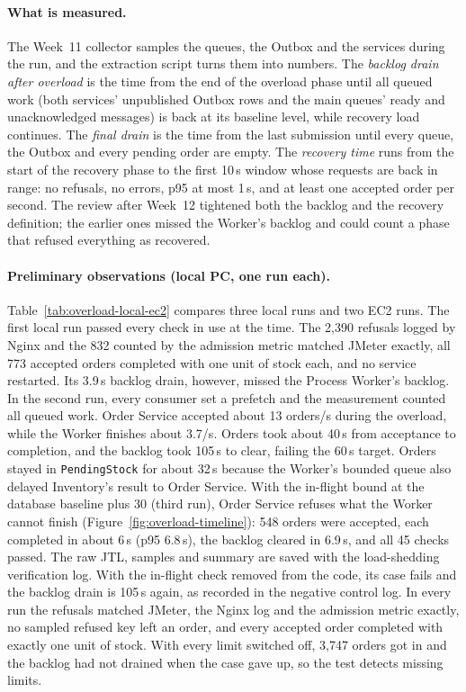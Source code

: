 \documentclass[a4paper]{report}
\begin{document}
\paragraph{What is measured.} The Week~11 collector samples the queues, the
Outbox and the services during the run, and the extraction script turns them
into numbers. The \emph{backlog drain after overload} is the time from the end
of the overload phase until all queued work (both services' unpublished Outbox
rows and the main queues' ready and unacknowledged messages) is back at its
baseline level, while recovery load continues. The \emph{final drain} is the
time from the last submission until every queue, the Outbox and every pending
order are empty. The \emph{recovery time} runs from the start of the recovery
phase to the first 10\,s window whose requests are back in range: no refusals,
no errors, p95 at most 1\,s, and at least one accepted order per second. The
review after Week~12 tightened both the backlog and the recovery definition;
the earlier ones missed the Worker's backlog and could count a phase that
refused everything as recovered.

\paragraph{Preliminary observations (local PC, one run each).}
Table~\ref{tab:overload-local-ec2} compares three local runs and two EC2 runs.
The first local run passed every check in use at the time. The 2,390
refusals logged by Nginx and the 832 counted by the admission metric matched
JMeter exactly, all 773 accepted orders completed with one unit of stock each,
and no service restarted. Its 3.9\,s backlog drain, however, missed the
Process Worker's backlog. In the second run, every consumer set a prefetch and
the measurement counted all queued work. Order Service accepted about 13
orders/s during the overload, while the Worker finishes about 3.7/s. Orders
took about 40\,s from acceptance to completion, and the backlog took 105\,s to
clear, failing the 60\,s target. Orders stayed in \texttt{PendingStock} for
about 32\,s because the Worker's bounded queue also delayed Inventory's result
to Order Service. With the in-flight bound at the
database baseline plus 30 (third run), Order Service refuses what the Worker
cannot finish (Figure~\ref{fig:overload-timeline}): 548 orders were accepted,
each completed in about 6\,s (p95 6.8\,s), the backlog cleared in 6.9\,s, and
all 45 checks passed. The raw JTL, samples and summary are saved with the
load-shedding verification log. With the in-flight check removed from the
code, its case fails and the backlog drain is 105\,s again, as recorded in
the negative control log.
In every run the refusals matched JMeter, the Nginx log and the admission
metric exactly, no sampled refused key left an order, and every accepted order
completed with exactly one unit of stock. With every limit switched off, 3,747
orders got in and the backlog had not drained when the case gave up, so the
test detects missing limits.
\end{document}
